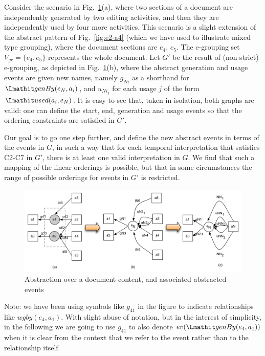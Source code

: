 Consider the scenario in Fig.~\ref{fig:e4-e5}(a), where two sections of a document are independently generated by two editing activities, and then they are independently used by four more activities. %
%
This scenario is a slight extension of the abstract pattern of Fig.~\ref{fig:e2-a4} (which we have used to illustrate mixed type grouping), where the document sections are $e_4$, $e_5$. 
%
The e-grouping set $V_{gr} = \{ e_4, e_5\}$ represents the whole document. Let $G'$ be the result of (non-strict) e-grouping, as depicted in Fig.~\ref{fig:e4-e5}(b), where the abstract generation and usage events are given new names, namely $g_{Ni}$ as a shorthand for $\wgby(e_N,a_i)$, and $u_{Ni_j}$ for each usage $j$ of the form $\used(a_i, e_N)$. It is easy to see that, taken in isolation, both graphs are valid: one can define the start, end, generation and usage events so that the ordering constraints are satisfied in $G'$.
%

Our goal is to go one step further, and define the new abstract events in terms of the events in $G$, in such a way that for each temporal interpretation that satisfies C2-C7 in $G'$, there is at least one valid interpretation in $G$.
%
We find that such a mapping of the linear orderings is possible,  but that in some circumstances the range of possible orderings for events in $G'$ is restricted.


\begin{figure}
\centering
\includegraphics[scale=.5]{figures/e4-e5.pdf} 
\caption{Abstraction over a document content, and associated abstracted events} \label{fig:e4-e5}
\end{figure}

Note: we have been using symbols like $g_{41}$ in the figure to indicate relationships like $wgby(e_4, a_1)$. 
With slight abuse of notation, but in the interest of simplicity, in the following we are going to use $g_{41}$ to also denote $ev(\wgby(e_4, a_1))$ when it is clear from the context that we refer to the event rather than to the relationship itself.
\\

